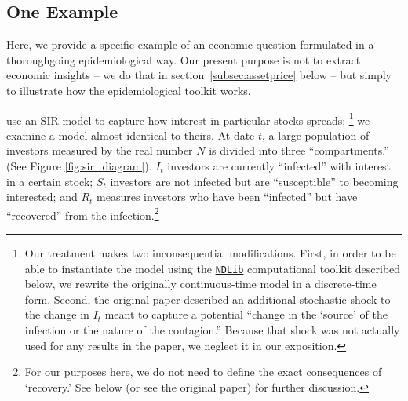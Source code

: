 
\subsection{One Example}\label{subsec:SIRModel}
\label{subsec:shillerpound}
Here, we provide a specific example of an economic question formulated in a thoroughgoing epidemiological way.  Our present purpose is not to extract economic insights -- we do that in section~{\ref{subsec:assetprice}} below -- but simply to illustrate how the epidemiological toolkit works.

 use an SIR model to capture how interest in particular stocks spreads;
{\footnote{Our treatment makes two inconsequential modifications.  First, in order to be able to instantiate the model using the \href{https://ndlib.readthedocs.io/en/latest/}{\texttt{NDLib}} computational toolkit described below, we rewrite the originally continuous-time model in a discrete-time form. Second, the original paper described an additional stochastic shock to the change in $I_t$ meant to capture a potential ``change in the `source' of the infection or the nature of the contagion.''  Because that shock was not actually used for any results in the paper, we neglect it in our exposition.}}%
 we examine a model almost identical to theirs.
At date  $t$, a large population of investors measured by the real number $N$ is divided into three ``compartments.''  (See Figure \ref{fig:sir_diagram}).  $I_t$ investors are currently ``infected'' with interest in a certain stock;  $S_t$ investors are not infected but are ``susceptible'' to becoming interested; and $R_t$ measures investors who have been ``infected'' but have ``recovered'' from the infection.\footnote{For our purposes here, we do not need to define the exact consequences of `recovery.'  See below (or see the original paper) for further discussion.}


